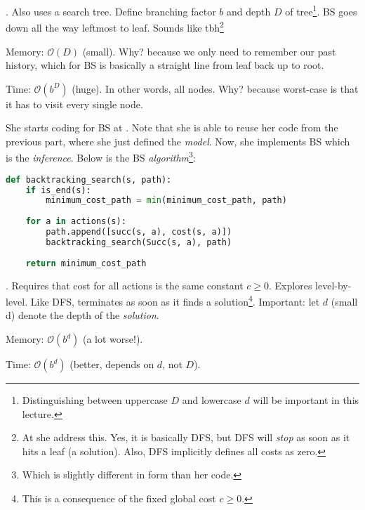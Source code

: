 \documentclass[11pt]{article}
\newcommand\myspace[1][]{\vspace{#1\bigskipamount}\Needspace{10\baselineskip}}
\newcommand\p{\Needspace{10\baselineskip} \noindent}
\begin{document}
\myspace
\p {} . Also uses a search tree. Define branching factor $b$ and depth $D$ of tree\footnote{Distinguishing between uppercase $D$ and lowercase $d$ will be important in this lecture.}. BS goes down all the way leftmost to leaf. Sounds like  tbh\footnote{At  she address this. Yes, it is basically DFS, but DFS will \textit{stop} as soon as it hits a leaf (a solution). Also, DFS implicitly defines all costs as zero.}
\begin{compactitem}
	\item Memory: $\mathcal O(D)$ (small). Why? because we only need to remember our past history, which for BS is basically a straight line from leaf back up to root. 
	
	\item Time: $\mathcal O(b^D)$ (huge). In other words, all nodes. Why? because worst-case is that it has to visit every single node. 
\end{compactitem}

\myspace{}
She starts coding for BS at . Note that she is able to reuse her code from the previous part, where she just defined the \textit{model}. Now, she implements BS which is the \textit{inference}. Below is the BS \textit{algorithm}\footnote{Which is slightly different in form than her code.}:
\begin{lstlisting}[language=Python]
def backtracking_search(s, path):
	if is_end(s):
		minimum_cost_path = min(minimum_cost_path, path)
	
	for a in actions(s):
		path.append([succ(s, a), cost(s, a)])
		backtracking_search(Succ(s, a), path)
	
	return minimum_cost_path
\end{lstlisting}

\myspace
\p {} . Requires that cost for all actions is the same constant $c \ge 0$. Explores level-by-level. Like DFS, terminates as soon as it finds a solution\footnote{This is a consequence of the fixed global cost $c \ge 0$.}. Important: let $d$ (small d) denote the depth of the \textit{solution}. 
\begin{compactitem}
	\item Memory: $\mathcal O(b^d)$ (a lot worse!).
	\item Time: $\mathcal O(b^d)$ (better, depends on $d$, not $D$).
\end{compactitem}
\end{document}
